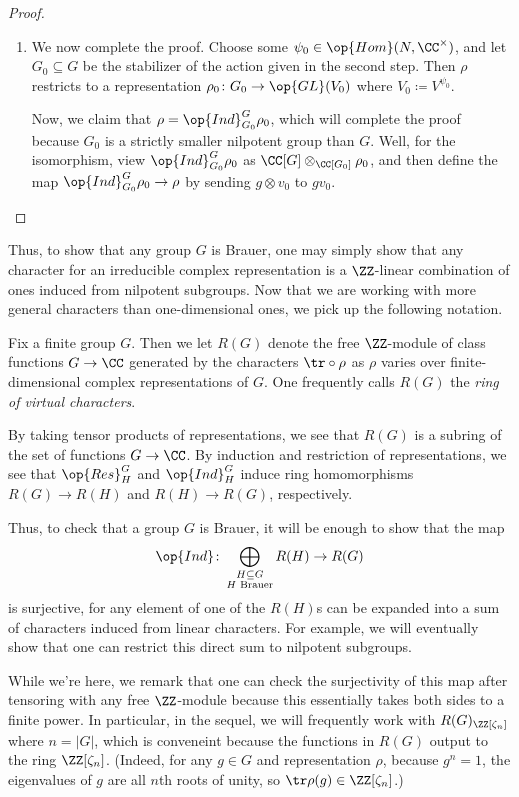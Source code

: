 \documentclass[../thesis.tex]{subfiles}
\begin{document}
\begin{proof}
\begin{enumerate}
		\item We now complete the proof. Choose some $\psi_0\in\op{Hom}(N,\CC^\times)$, and let $G_0\subseteq G$ be the stabilizer of the action given in the second step. Then $\rho$ restricts to a representation $\rho_0\colon G_0\to\op{GL}(V_0)$ where $V_0\coloneqq V^{\psi_0}$.
		
		Now, we claim that $\rho=\op{Ind}_{G_0}^G\rho_0$, which will complete the proof because $G_0$ is a strictly smaller nilpotent group than $G$. Well, for the isomorphism, view $\op{Ind}_{G_0}^G\rho_0$ as $\CC[G]\otimes_{\CC[G_0]}\rho_0$, and then define the map $\op{Ind}_{G_0}^G\rho_0\to\rho$ by sending $g\otimes v_0$ to $gv_0$.
		\qedhere
	\end{enumerate}
\end{proof}
Thus, to show that any group $G$ is Brauer, one may simply show that any character for an irreducible complex representation is a $\ZZ$-linear combination of ones induced from nilpotent subgroups. Now that we are working with more general characters than one-dimensional ones, we pick up the following notation.
\begin{definition}
	Fix a finite group $G$. Then we let $R(G)$ denote the free $\ZZ$-module of class functions $G\to\CC$ generated by the characters ${\tr}\circ\rho$ as $\rho$ varies over finite-dimensional complex representations of $G$. One frequently calls $R(G)$ the \textit{ring of virtual characters}.
\end{definition}
\begin{remark}
	By taking tensor products of representations, we see that $R(G)$ is a subring of the set of functions $G\to\CC$. By induction and restriction of representations, we see that $\op{Res}^G_H$ and $\op{Ind}^G_H$ induce ring homomorphisms $R(G)\to R(H)$ and $R(H)\to R(G)$, respectively.
\end{remark}
Thus, to check that a group $G$ is Brauer, it will be enough to show that the map
\[\op{Ind}\colon\bigoplus_{\substack{H\subseteq G\\H\text{ Brauer}}}R(H)\to R(G)\]
is surjective, for any element of one of the $R(H)$s can be expanded into a sum of characters induced from linear characters. For example, we will eventually show that one can restrict this direct sum to nilpotent subgroups.
\begin{remark}
	While we're here, we remark that one can check the surjectivity of this map after tensoring with any free $\ZZ$-module because this essentially takes both sides to a finite power. In particular, in the sequel, we will frequently work with $R(G)_{\ZZ[\zeta_n]}$ where $n=\left|G\right|$, which is conveneint because the functions in $R(G)$ output to the ring $\ZZ[\zeta_n]$. (Indeed, for any $g\in G$ and representation $\rho$, because $g^n=1$, the eigenvalues of $g$ are all $n$th roots of unity, so $\tr\rho(g)\in\ZZ[\zeta_n]$.)
\end{remark}
\end{document}
